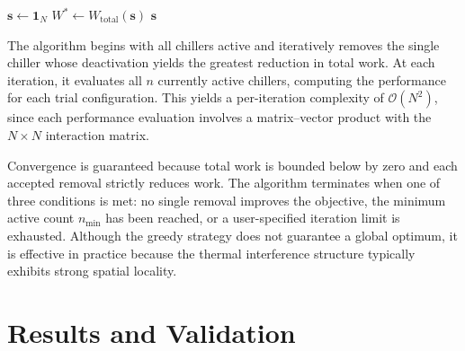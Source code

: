 \documentclass[11pt, a4paper]{article}
\begin{document}
\begin{algorithm}[htbp]
    \SetAlgoLined
    $\mathbf{s} \leftarrow \mathbf{1}_N$ 
    $W^{*} \leftarrow W_{\mathrm{total}}(\mathbf{s})$ 
    \Return $\mathbf{s}$\;
    \caption{Greedy chiller removal algorithm.}
    \label{alg:greedy}
\end{algorithm}

The algorithm begins with all chillers active and iteratively removes the single chiller whose deactivation yields the greatest reduction in total work.
At each iteration, it evaluates all $n$ currently active chillers, computing the performance for each trial configuration.
This yields a per-iteration complexity of $\mathcal{O}(N^2)$, since each performance evaluation involves a matrix--vector product with the $N \times N$ interaction matrix.

Convergence is guaranteed because total work is bounded below by zero and each accepted removal strictly reduces work.
The algorithm terminates when one of three conditions is met: no single removal improves the objective, the minimum active count $n_{\min}$ has been reached, or a user-specified iteration limit is exhausted.
Although the greedy strategy does not guarantee a global optimum, it is effective in practice because the thermal interference structure typically exhibits strong spatial locality.

\section{Results and Validation}
\label{sec:results}
\end{document}
